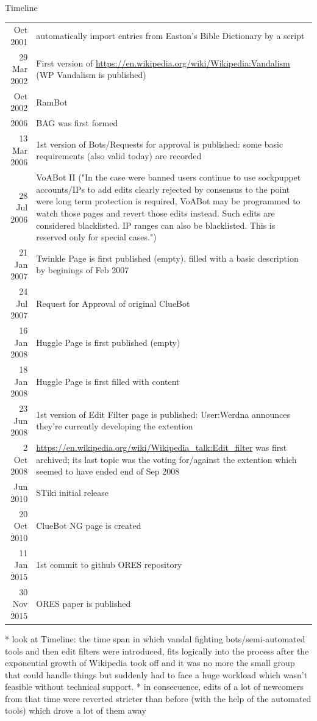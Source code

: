 Timeline
\begin{longtable}{ r | p{}}
   Oct 2001 & automatically import entries from Easton’s Bible Dictionary by a script \\
29 Mar 2002 & First version of \url{https://en.wikipedia.org/wiki/Wikipedia:Vandalism} (WP Vandalism is published) \\
   Oct 2002 & RamBot \\
       2006 & BAG was first formed \\
13 Mar 2006 & 1st version of Bots/Requests for approval is published: some basic requirements (also valid today) are recorded \\
28 Jul 2006 & VoABot II ("In the case were banned users continue to use sockpuppet accounts/IPs to add edits clearly rejected by consensus to the point were long term protection is required, VoABot may be programmed to watch those pages and revert those edits instead. Such edits are considered blacklisted. IP ranges can also be blacklisted. This is reserved only for special cases.") \\
21 Jan 2007 & Twinkle Page is first published (empty), filled with a basic description by beginings of Feb 2007 \\
24 Jul 2007 & Request for Approval of original ClueBot \\
16 Jan 2008 & Huggle Page is first published (empty) \\
18 Jan 2008 & Huggle Page is first filled with content \\
23 Jun 2008 & 1st version of Edit Filter page is published: User:Werdna announces they're currently developing the extention \\
 2 Oct 2008 & \url{https://en.wikipedia.org/wiki/Wikipedia_talk:Edit_filter} was first archived; its last topic was the voting for/against the extention which seemed to have ended end of Sep 2008 \\
   Jun 2010 & STiki initial release \\
20 Oct 2010 & ClueBot NG page is created \\
11 Jan 2015 & 1st commit to github ORES repository \\
30 Nov 2015 & ORES paper is published
\end{longtable}

* look at Timeline: the time span in which vandal fighting bots/semi-automated tools and then edit filters were introduced, fits logically into the process after the exponential growth of Wikipedia took off and it was no more the small group that could handle things but suddenly had to face a huge workload which wasn't feasible without technical support.
* in consecuence, edits of a lot of newcomers from that time were reverted stricter than before (with the help of the automated tools) which drove a lot of them away

